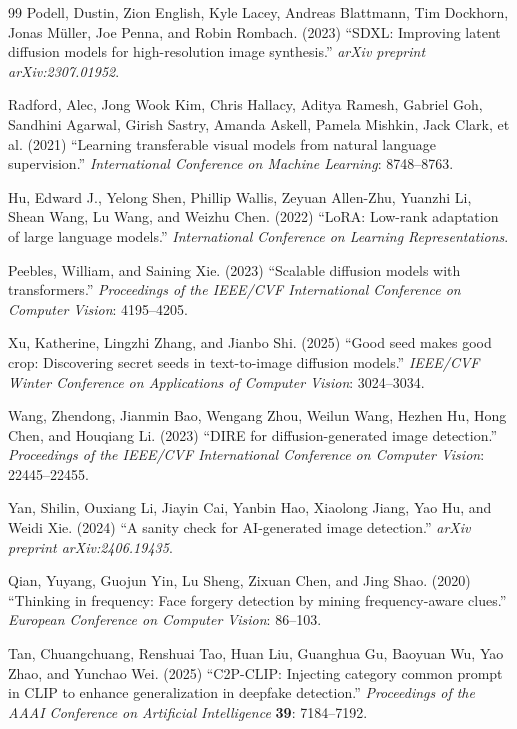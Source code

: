 \documentclass[3p,times,procedia]{elsarticle}
\begin{document}
\begin{thebibliography}{99}
Podell, Dustin, Zion English, Kyle Lacey, Andreas Blattmann, Tim Dockhorn,
Jonas M\"{u}ller, Joe Penna, and Robin Rombach. (2023) ``SDXL: Improving
latent diffusion models for high-resolution image synthesis.''
\textit{arXiv preprint arXiv:2307.01952}.

Radford, Alec, Jong Wook Kim, Chris Hallacy, Aditya Ramesh, Gabriel Goh,
Sandhini Agarwal, Girish Sastry, Amanda Askell, Pamela Mishkin, Jack
Clark, et al. (2021) ``Learning transferable visual models from natural
language supervision.'' \textit{International Conference on Machine
Learning}: 8748--8763.

Hu, Edward J., Yelong Shen, Phillip Wallis, Zeyuan Allen-Zhu, Yuanzhi Li,
Shean Wang, Lu Wang, and Weizhu Chen. (2022) ``LoRA: Low-rank adaptation
of large language models.'' \textit{International Conference on Learning
Representations}.

Peebles, William, and Saining Xie. (2023) ``Scalable diffusion models with
transformers.'' \textit{Proceedings of the IEEE/CVF International
Conference on Computer Vision}: 4195--4205.

Xu, Katherine, Lingzhi Zhang, and Jianbo Shi. (2025) ``Good seed makes good
crop: Discovering secret seeds in text-to-image diffusion models.''
\textit{IEEE/CVF Winter Conference on Applications of Computer Vision}:
3024--3034.

Wang, Zhendong, Jianmin Bao, Wengang Zhou, Weilun Wang, Hezhen Hu, Hong
Chen, and Houqiang Li. (2023) ``DIRE for diffusion-generated image
detection.'' \textit{Proceedings of the IEEE/CVF International Conference
on Computer Vision}: 22445--22455.

Yan, Shilin, Ouxiang Li, Jiayin Cai, Yanbin Hao, Xiaolong Jiang, Yao Hu,
and Weidi Xie. (2024) ``A sanity check for AI-generated image detection.''
\textit{arXiv preprint arXiv:2406.19435}.

Qian, Yuyang, Guojun Yin, Lu Sheng, Zixuan Chen, and Jing Shao. (2020)
``Thinking in frequency: Face forgery detection by mining frequency-aware
clues.'' \textit{European Conference on Computer Vision}: 86--103.

Tan, Chuangchuang, Renshuai Tao, Huan Liu, Guanghua Gu, Baoyuan Wu, Yao
Zhao, and Yunchao Wei. (2025) ``C2P-CLIP: Injecting category common prompt
in CLIP to enhance generalization in deepfake detection.''
\textit{Proceedings of the AAAI Conference on Artificial Intelligence}
\textbf{39}: 7184--7192.


\end{thebibliography}
\end{document}
